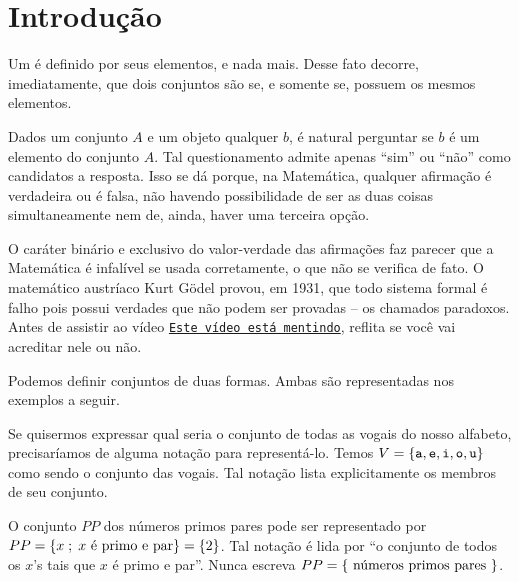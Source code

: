 \section{Introdução}
\label{sec:intro}

Um  é definido por seus elementos, e nada mais. Desse fato decorre, imediatamente, que dois conjuntos são  se, e somente se, possuem os mesmos elementos.

Dados um conjunto $A$ e um objeto qualquer $b$, é natural perguntar se $b$ é um elemento do conjunto $A$. Tal questionamento admite apenas ``sim'' ou ``não'' como candidatos a resposta. Isso se dá porque, na Matemática, qualquer afirmação é verdadeira ou é falsa, não havendo possibilidade de ser as duas coisas simultaneamente nem de, ainda, haver uma terceira opção. 

O caráter binário e exclusivo do valor-verdade das afirmações faz parecer que a Matemática é infalível se usada corretamente, o que não se verifica de fato. O matemático austríaco Kurt Gödel provou, em 1931, que todo sistema formal é falho pois possui verdades que não podem ser provadas -- os chamados paradoxos. Antes de assistir ao vídeo \href{https://youtu.be/UI1xR_AECrU}{{\tt Este vídeo está mentindo}}, reflita se você vai acreditar nele ou não.

\begin{remark}
Podemos definir conjuntos de duas formas. Ambas são representadas nos exemplos a seguir.
\end{remark}

\begin{example}
\label{ex-vogais}
Se quisermos expressar qual seria o conjunto de todas as vogais do nosso alfabeto, precisaríamos de alguma notação para representá-lo. 
Temos $V=\left\{ \texttt{a}, \texttt{e}, \texttt{i}, \texttt{o}, \texttt{u}\right\}$ como sendo o conjunto das vogais. Tal notação lista explicitamente os membros de seu conjunto.
\end{example}

\begin{example}
\label{ex-primos-pares}
O conjunto $PP$ dos números primos pares pode ser representado por $PP = \left\{ x \;;\; x \text{ é primo e par}\right\} = \left\{ 2\right\}$. Tal notação é lida por ``o conjunto de todos os $x$'s tais que $x$ é primo e par''. Nunca escreva $PP = \left\{ \text{ números primos pares }\right\}$.
\end{example}

%
